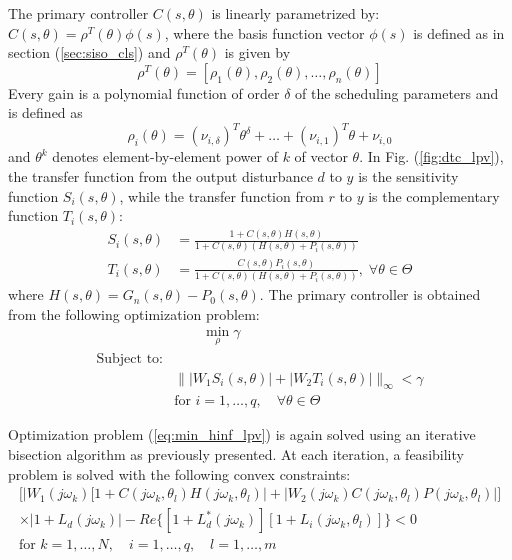 \documentclass[default]{svmult}
\begin{document}
The primary controller ${C}(s,\theta)$ is linearly parametrized by:
$
C(s,\theta)=\rho^T(\theta) \phi(s)
$,
where the basis function vector $\phi(s)$ is defined as in section (\ref{sec:siso_cls}) and $\rho^T(\theta)$
is given by
\begin{equation}	
 \rho^T(\theta)=[\rho_{1}(\theta),\rho_{2}(\theta), \ldots, \rho_{n}(\theta)]
\end{equation}
Every gain is a polynomial function of order $\delta$  of the scheduling parameters and is defined as
\begin{equation}
\rho_{i}(\theta)=(\nu_{i, \delta})^T\theta^{\delta}+\ldots+(\nu_{i, 1})^T\theta+ \nu_{i, 0}
\end{equation}
and $\theta^{k}$ denotes element-by-element power of $k$ of vector $\theta$.
In Fig. (\ref{fig:dtc_lpv}), the transfer function from the output disturbance $d$ to $y$ is the sensitivity function $S_i(s,\theta)$, while the transfer function from $r$ to $y$ is the complementary function $T_i(s,\theta)$:
\begin{align}
S_i(s,\theta)&=\frac{1+C(s,\theta)H(s,\theta)}{1+C(s,\theta)(H(s,\theta)+P_i(s,\theta)) } \\ \nonumber
T_i(s,\theta)&=\frac{C(s,\theta)P_i(s,\theta)}{1+C(s,\theta)(H(s,\theta)+P_i(s,\theta)) }, \; \forall \theta \in \Theta
\end{align}
where $H(s,\theta)=G_n(s,\theta)-P_0(s,\theta)$. The primary controller is obtained from the following optimization problem:
\begin{align}\label{eq:min_hinf_lpv}
&\qquad \min_{\rho} \gamma \nonumber \\\mbox{Subject to:} &\\ \nonumber
& \|  |W_1S_i(s,\theta)| + |W_2T_i(s,\theta)| \|_{\infty}<\gamma\\ 
& \mbox{for } i=1,\dots,q,  \quad \forall \theta \in \Theta \nonumber
\end{align}

%

Optimization problem (\ref{eq:min_hinf_lpv}) is again solved using an iterative bisection algorithm as previously presented. At each iteration, a feasibility problem is solved with the following convex constraints:
\begin{eqnarray} \label{eq:cond_lpv}
\Big [ |W_{1}(j\omega_k)[1+C(j\omega_k,\theta_l)H(j\omega_k,\theta_l)|+|W_{2}(j\omega_k)C(j\omega_k,\theta_l)P(j\omega_k,\theta_l) | \Big ] \nonumber\\ \times |1+L_{d}(j\omega_k)|-
Re\{[1+L^{\ast}_{d}(j\omega_k)][1+L_i(j\omega_k,\theta_l)]\}<0 \nonumber\\ \mbox{for } k=1,\dots,N,\quad  i=1,\ldots,q, \quad l=1,\ldots,m  
\end{eqnarray}
\end{document}
